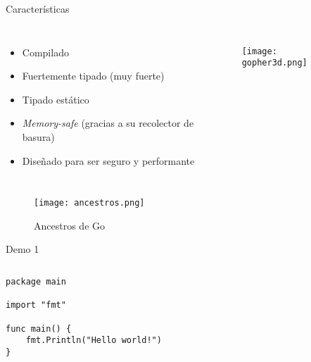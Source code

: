 \setwatermark{}

\begin{frame}{Características}

    \begin{columns}
            \begin{itemize}
                \item Compilado
                \item Fuertemente tipado (muy fuerte)
                \item Tipado estático
                \item \emph{Memory-safe} (gracias a su recolector de basura) 
                \item Diseñado para ser seguro y performante
            \end{itemize}

            \begin{figure}[H]
                \centering
                \texttt{[image: gopher3d.png]}
            \end{figure}
    \end{columns}


\end{frame}




\begin{frame}
    \begin{figure}[H]
        \centering
        \texttt{[image: ancestros.png]}
        \caption{Ancestros de Go \autocite{BookTheGoProgrammingLanguage:Preface}}
    \end{figure}
\end{frame}


\begin{frame}[fragile]{Demo 1}

{
    \renewcommand{\baselinestretch}{1} 

    \begin{columns}
        \begin{lstlisting}[title={\dq{Hola mundo!} en Go}]
package main

import "fmt"

func main() {
    fmt.Println("Hello world!")
}
        \end{lstlisting}
    \end{columns}
}
\end{frame}




